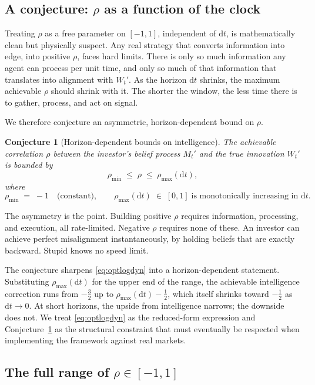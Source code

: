 \documentclass[11pt]{article}
\newtheorem{conjecture}{Conjecture}
\newcommand{\dd}{\mathrm{d}}
\begin{document}
\subsection{A conjecture: $\rho$ as a function of the clock}

Treating $\rho$ as a free parameter on $[-1, 1]$, independent of
$\dd t$, is mathematically clean but physically suspect. Any real
strategy that converts information into edge, into positive $\rho$, faces hard limits. There is only so much information any
agent can process per unit time, and only so much of that information
that translates into alignment with $W_{t}'$. As the horizon $\dd t$
shrinks, the maximum achievable $\rho$ should shrink with it. The
shorter the window, the less time there is to gather, process, and
act on signal.

We therefore conjecture an asymmetric, horizon-dependent bound on
$\rho$.

\begin{conjecture}[Horizon-dependent bounds on intelligence]\label{conj:rhomax}
The achievable correlation $\rho$ between the investor's belief
process $M_{t}'$ and the true innovation $W_{t}'$ is bounded by
\[
  \rho_{\min} \;\leq\; \rho \;\leq\; \rho_{\max}(\dd t),
\]
where
\[
  \rho_{\min} \;=\; -1 \quad\text{(constant)},
  \qquad
  \rho_{\max}(\dd t) \;\in\; [0,1]
  \;\text{is monotonically increasing in } \dd t.
\]
\end{conjecture}

The asymmetry is the point. Building positive $\rho$ requires
information, processing, and execution, all rate-limited. Negative
$\rho$ requires none of these. An investor can achieve perfect
misalignment instantaneously, by holding beliefs that are exactly
backward. Stupid knows no speed limit.

The conjecture sharpens \eqref{eq:optlogdyn} into a horizon-dependent
statement. Substituting $\rho_{\max}(\dd t)$ for the upper end of
the range, the achievable intelligence correction runs from
$-\tfrac{3}{2}$ up to $\rho_{\max}(\dd t) - \tfrac{1}{2}$, which
itself shrinks toward $-\tfrac{1}{2}$ as $\dd t \to 0$. At short
horizons, the upside from intelligence narrows; the downside does
not. We treat \eqref{eq:optlogdyn} as the reduced-form expression
and Conjecture~\ref{conj:rhomax} as the structural constraint that
must eventually be respected when implementing the framework against
real markets.

\subsection{The full range of $\rho \in [-1, 1]$}
\end{document}
